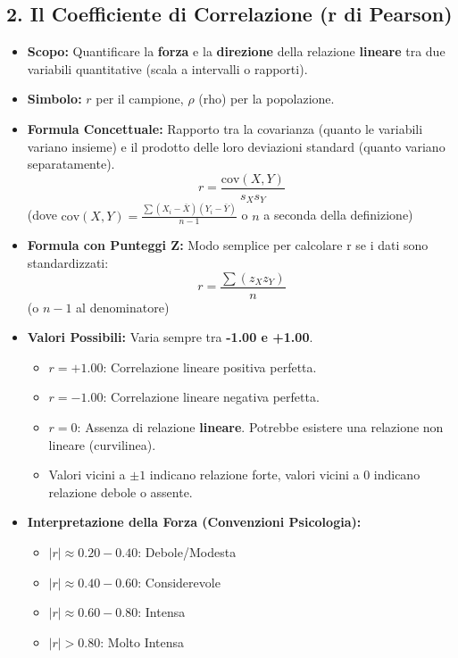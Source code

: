 \documentclass[12pt, a4paper]{article}
\newcommand{\rpearson}{r} %
\newcommand{\poprho}{\rho} %
\newcommand{\cov}{\text{cov}} %
\begin{document}
\subsection*{2. Il Coefficiente di Correlazione (r di Pearson)}
\begin{itemize}
    \item \textbf{Scopo:} Quantificare la \textbf{forza} e la \textbf{direzione} della relazione \textbf{lineare} tra due variabili quantitative (scala a intervalli o rapporti).
    \item \textbf{Simbolo:} $\rpearson$ per il campione, $\poprho$ (rho) per la popolazione.
    \item \textbf{Formula Concettuale:} Rapporto tra la covarianza (quanto le variabili variano insieme) e il prodotto delle loro deviazioni standard (quanto variano separatamente).
      $$ \rpearson = \frac{\cov(X, Y)}{s_X s_Y} $$
      (dove $\cov(X, Y) = \frac{\sum (X_i - \bar{X})(Y_i - \bar{Y})}{n-1}$ o $n$ a seconda della definizione)
    \item \textbf{Formula con Punteggi Z:} Modo semplice per calcolare r se i dati sono standardizzati:
      $$ \rpearson = \frac{\sum (z_X z_Y)}{n} $$
      (o $n-1$ al denominatore)
    \item \textbf{Valori Possibili:} Varia sempre tra \textbf{-1.00 e +1.00}.
        \begin{itemize}
            \item $\rpearson = +1.00$: Correlazione lineare positiva perfetta.
            \item $\rpearson = -1.00$: Correlazione lineare negativa perfetta.
            \item $\rpearson = 0$: Assenza di relazione \textbf{lineare}. Potrebbe esistere una relazione non lineare (curvilinea).
            \item Valori vicini a $\pm 1$ indicano relazione forte, valori vicini a 0 indicano relazione debole o assente.
        \end{itemize}
    \item \textbf{Interpretazione della Forza (Convenzioni Psicologia):}
        \begin{itemize}
            \item $|\rpearson| \approx 0.20 - 0.40$: Debole/Modesta
            \item $|\rpearson| \approx 0.40 - 0.60$: Considerevole
            \item $|\rpearson| \approx 0.60 - 0.80$: Intensa
            \item $|\rpearson| > 0.80$: Molto Intensa

\end{itemize}
\end{itemize}
\end{document}

